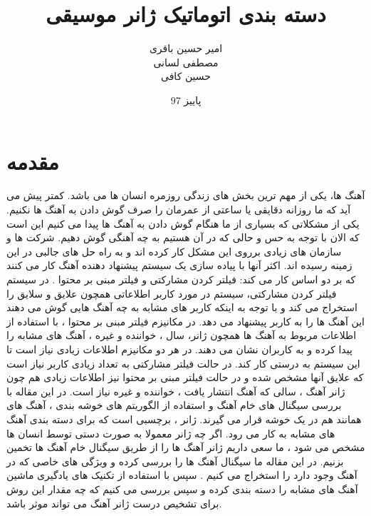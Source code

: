 \documentclass[conference]{IEEEtran}
\title{دسته بندی اتوماتیک ژانر موسیقی   }
\author{
امیر حسین باقری\\
مصطفی لسانی\\
حسین کافی
}
\date{پاییز 97}
\begin{document}
\maketitle





\section{مقدمه} 
آهنگ ها، یکی از مهم ترین بخش های زندگی روزمره انسان ها می باشد. کمتر پیش می آید که ما روزانه دقایقی یا ساعتی از عمرمان را صرف گوش دادن به آهنگ ها نکنیم. یکی از مشکلاتی که بسیاری از ما هنگام گوش دادن به آهنگ ها پیدا می کنیم این است که الان با توجه به حس و حالی که در آن هستیم به چه آهنگی گوش دهیم.
شرکت ها و سازمان های زیادی برروی این مشکل کار کرده اند و به راه حل های جالبی در این زمینه رسیده اند. اکثر آنها با پیاده سازی یک سیستم پیشنهاد دهنده آهنگ کار می کنند که بر دو اساس کار می کند: فیلتر کردن مشارکتی    و  فیلتر مبنی بر محتوا  . در سیستم فیلتر کردن مشارکتی، سیستم در مورد کاربر اطلاعاتی همچون علایق و سلایق را استخراج می کند و با توجه به اینکه کاربر های مشابه به چه آهنگ هایی گوش می دهند این آهنگ ها را به کاربر پیشنهاد می دهد. در مکانیزم فیلتر مبنی بر محتوا ، با استفاده از اطلاعات مربوط به آهنگ ها همچون ژانر، سال ، خواننده و غیره ، آهنگ های مشابه را پیدا کرده و به کاربران نشان می دهند. در هر دو مکانیزم اطلاعات زیادی نیاز است تا این سیستم به درستی کار کند. در حالت فیلتر مشارکتی به تعداد زیادی کاربر نیاز است که علایق آنها مشخص شده و در حالت فیلتر مبنی بر محتوا نیز اطلاعات زیادی هم چون ژانر آهنگ ، سالی که آهنگ انتشار یافت ، خواننده و غیره نیاز است. 
در این مقاله با بررسی سیگنال های خام آهنگ و استفاده از الگوریتم های خوشه بندی ، آهنگ های همانند هم در یک خوشه قرار می گیرند. 
ژانر ، برچسبی است که برای دسته بندی آهنگ های مشابه به کار می رود. اگر چه ژانر معمولا به صورت دستی توسط انسان ها مشخص می شود ، ما سعی داریم ژانر آهنگ ها را از طریق سیگنال خام آهنگ ها تخمین بزنیم. در این مقاله ما سیگنال آهنگ ها را بررسی کرده و ویژگی های خاصی که در آهنگ وجود دارد را استخراج می کنیم . سپس با استفاده از تکنیک های یادگیری ماشین آهنگ های مشابه را دسته بندی کرده و سپس بررسی می کنیم که چه مقدار این روش برای تشخیص درست ژانر آهنگ می تواند موثر باشد.
\end{document}
